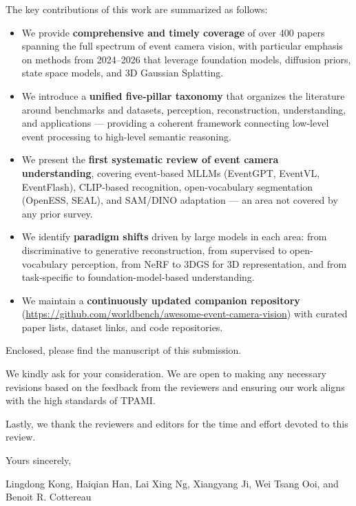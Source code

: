 \documentclass{article}
\begin{document}
The key contributions of this work are summarized as follows:
\begin{itemize}
    \item We provide \textbf{comprehensive and timely coverage} of over 400 papers spanning the full spectrum of event camera vision, with particular emphasis on methods from 2024--2026 that leverage foundation models, diffusion priors, state space models, and 3D Gaussian Splatting.

    \item We introduce a \textbf{unified five-pillar taxonomy} that organizes the literature around benchmarks and datasets, perception, reconstruction, understanding, and applications --- providing a coherent framework connecting low-level event processing to high-level semantic reasoning.

    \item We present the \textbf{first systematic review of event camera understanding}, covering event-based MLLMs (EventGPT, EventVL, EventFlash), CLIP-based recognition, open-vocabulary segmentation (OpenESS, SEAL), and SAM/DINO adaptation --- an area not covered by any prior survey.

    \item We identify \textbf{paradigm shifts} driven by large models in each area: from discriminative to generative reconstruction, from supervised to open-vocabulary perception, from NeRF to 3DGS for 3D representation, and from task-specific to foundation-model-based understanding.

    \item We maintain a \textbf{continuously updated companion repository} (\url{https://github.com/worldbench/awesome-event-camera-vision}) with curated paper lists, dataset links, and code repositories.
\end{itemize}

Enclosed, please find the manuscript of this submission.

We kindly ask for your consideration. We are open to making any necessary revisions based on the feedback from the reviewers and ensuring our work aligns with the high standards of TPAMI.

Lastly, we thank the reviewers and editors for the time and effort devoted to this review.

\vspace{0.3cm}

Yours sincerely,

\vspace{0.3cm}

Lingdong Kong, Haiqian Han, Lai Xing Ng, Xiangyang Ji, Wei Tsang Ooi, and Benoit R. Cottereau
\end{document}
